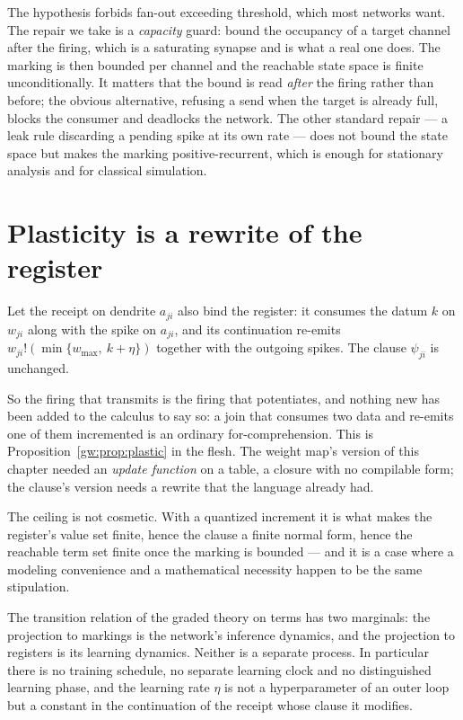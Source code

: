 The hypothesis forbids fan-out exceeding threshold, which most networks want. The repair
we take is a \emph{capacity} guard: bound the occupancy of a target channel after the
firing, which is a saturating synapse and is what a real one does. The marking is then
bounded per channel and the reachable state space is finite unconditionally. It matters
that the bound is read \emph{after} the firing rather than before; the obvious
alternative, refusing a send when the target is already full, blocks the consumer and
deadlocks the network. The other standard repair --- a leak rule discarding a pending
spike at its own rate --- does not bound the state space but makes the marking
positive-recurrent, which is enough for stationary analysis and for classical simulation.

\section{Plasticity is a rewrite of the register}
\label{spk:sec:plastic}

\begin{definition}
\label{spk:def:hebb}
Let the receipt on dendrite $a_{ji}$ also bind the register: it consumes the datum $k$
on $w_{ji}$ along with the spike on $a_{ji}$, and its continuation re-emits
$w_{ji}!(\min\{w_{\max},\ k + \eta\})$ together with the outgoing spikes. The clause
$\psi_{ji}$ is unchanged.
\end{definition}

So the firing that transmits is the firing that potentiates, and nothing new has been
added to the calculus to say so: a join that consumes two data and re-emits one of them
incremented is an ordinary for-comprehension. This is Proposition~\ref{gw:prop:plastic}
in the flesh. The weight map's version of this chapter needed an \emph{update function}
on a table, a closure with no compilable form; the clause's version needs a rewrite that
the language already had.

The ceiling is not cosmetic. With a quantized increment it is what makes the register's
value set finite, hence the clause a finite normal form, hence the reachable term set
finite once the marking is bounded --- and it is a case where a modeling convenience and
a mathematical necessity happen to be the same stipulation.

\begin{theorem}
\label{spk:thm:one}
The transition relation of the graded theory on terms has two marginals: the projection
to markings is the network's inference dynamics, and the projection to registers is its
learning dynamics. Neither is a separate process. In particular there is no training
schedule, no separate learning clock and no distinguished learning phase, and the
learning rate $\eta$ is not a hyperparameter of an outer loop but a constant in the
continuation of the receipt whose clause it modifies.
\end{theorem}

